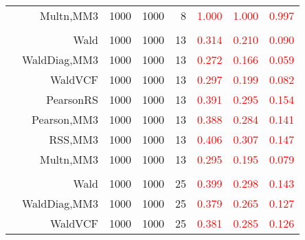 \documentclass[
]{article}
\begin{document}
\begin{table}[H]
{\begin{tabular}[t]{lrrrrrrr}
\hspace{1em} & Multn,MM3 & 1000 & 1000 & 8 & \textcolor{red}{1.000} & \textcolor{red}{1.000} & \textcolor{red}{0.997}\\
\cmidrule{1-8}
\addlinespace[0.3em]
\multicolumn{8}{l}{\textbf{2F 10V}}\\
\hspace{1em} & Wald & 1000 & 1000 & 13 & \textcolor{red}{0.314} & \textcolor{red}{0.210} & \textcolor{red}{0.090}\\

\hspace{1em} & WaldDiag,MM3 & 1000 & 1000 & 13 & \textcolor{red}{0.272} & \textcolor{red}{0.166} & \textcolor{red}{0.059}\\

\hspace{1em} & WaldVCF & 1000 & 1000 & 13 & \textcolor{red}{0.297} & \textcolor{red}{0.199} & \textcolor{red}{0.082}\\

\hspace{1em} & PearsonRS & 1000 & 1000 & 13 & \textcolor{red}{0.391} & \textcolor{red}{0.295} & \textcolor{red}{0.154}\\

\hspace{1em} & Pearson,MM3 & 1000 & 1000 & 13 & \textcolor{red}{0.388} & \textcolor{red}{0.284} & \textcolor{red}{0.141}\\

\hspace{1em} & RSS,MM3 & 1000 & 1000 & 13 & \textcolor{red}{0.406} & \textcolor{red}{0.307} & \textcolor{red}{0.147}\\

\hspace{1em} & Multn,MM3 & 1000 & 1000 & 13 & \textcolor{red}{0.295} & \textcolor{red}{0.195} & \textcolor{red}{0.079}\\
\cmidrule{1-8}
\addlinespace[0.3em]
\multicolumn{8}{l}{\textbf{3F 15V}}\\
\hspace{1em} & Wald & 1000 & 1000 & 25 & \textcolor{red}{0.399} & \textcolor{red}{0.298} & \textcolor{red}{0.143}\\

\hspace{1em} & WaldDiag,MM3 & 1000 & 1000 & 25 & \textcolor{red}{0.379} & \textcolor{red}{0.265} & \textcolor{red}{0.127}\\

\hspace{1em} & WaldVCF & 1000 & 1000 & 25 & \textcolor{red}{0.381} & \textcolor{red}{0.285} & \textcolor{red}{0.126}\\


\end{tabular}}
\end{table}
\end{document}
